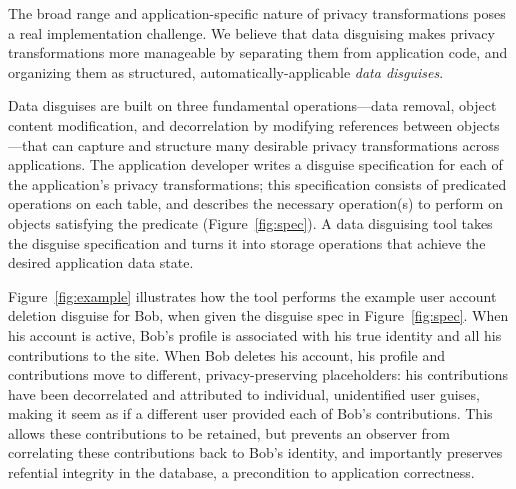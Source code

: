The broad range and application-specific nature of privacy transformations poses a real
implementation challenge. We believe that data disguising makes
privacy transformations more manageable by separating them from application code,
and organizing them as structured, automatically-applicable \emph{data disguises}.

Data disguises are built on three fundamental operations---data removal, object content
modification, and decorrelation by modifying references between objects---that can capture and
structure many desirable privacy transformations across applications.
%
The application developer writes a disguise specification for each of the application's privacy
transformations; this specification consists of predicated operations on each table, and describes
the necessary operation(s) to perform on objects satisfying the predicate (Figure~\ref{fig:spec}).
A data disguising tool takes the disguise specification and turns it into storage operations that
achieve the desired application data state.

Figure~\ref{fig:example} illustrates how the tool performs the example user
account deletion disguise for Bob, when given the disguise spec in Figure~\ref{fig:spec}.
%
When his account is active, Bob's profile is associated with his true identity and all his
contributions to the site.
%
When Bob deletes his account, his profile and contributions move to different, privacy-preserving
placeholders: 
his contributions have been decorrelated and attributed to individual, unidentified user guises, 
making it seem as if a different user provided each of Bob's contributions.
%
This allows these contributions to be retained, but prevents an observer from correlating these
contributions back to Bob's identity, and 
importantly preserves refential integrity in the database, a precondition to application
correctness.


%
%
%

